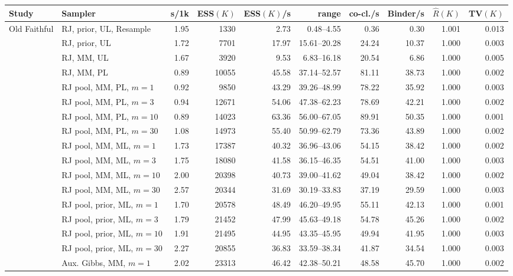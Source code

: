 \begin{tabular}{ll rrrrrrrr}
\toprule
Study & Sampler & s/1k & ESS$(K)$ & ESS$(K)$/s & range & co-cl./s & Binder/s & $\hat R(K)$ & TV$(K)$ \\
\midrule
Old Faithful & RJ, prior, UL, Resample & 1.95 & 1330 & 2.73 & 0.48--4.55 & 0.36 & 0.30 & 1.001 & 0.013 \\
 & RJ, prior, UL & 1.72 & 7701 & 17.97 & 15.61--20.28 & 24.24 & 10.37 & 1.000 & 0.003 \\
 & RJ, MM, UL & 1.67 & 3920 & 9.53 & 6.83--16.18 & 20.54 & 6.86 & 1.000 & 0.005 \\
 & RJ, MM, PL & 0.89 & 10055 & 45.58 & 37.14--52.57 & 81.11 & 38.73 & 1.000 & 0.002 \\
 & RJ pool, MM, PL, $m{=}1$ & 0.92 & 9850 & 43.29 & 39.26--48.99 & 78.22 & 35.92 & 1.000 & 0.003 \\
 & RJ pool, MM, PL, $m{=}3$ & 0.94 & 12671 & 54.06 & 47.38--62.23 & 78.69 & 42.21 & 1.000 & 0.002 \\
 & RJ pool, MM, PL, $m{=}10$ & 0.89 & 14023 & 63.36 & 56.00--67.05 & 89.91 & 50.35 & 1.000 & 0.001 \\
 & RJ pool, MM, PL, $m{=}30$ & 1.08 & 14973 & 55.40 & 50.99--62.79 & 73.36 & 43.89 & 1.000 & 0.002 \\
 & RJ pool, MM, ML, $m{=}1$ & 1.73 & 17387 & 40.32 & 36.96--43.06 & 54.15 & 38.42 & 1.000 & 0.002 \\
 & RJ pool, MM, ML, $m{=}3$ & 1.75 & 18080 & 41.58 & 36.15--46.35 & 54.51 & 41.00 & 1.000 & 0.003 \\
 & RJ pool, MM, ML, $m{=}10$ & 2.00 & 20398 & 40.73 & 39.00--41.62 & 49.04 & 38.42 & 1.000 & 0.002 \\
 & RJ pool, MM, ML, $m{=}30$ & 2.57 & 20344 & 31.69 & 30.19--33.83 & 37.19 & 29.59 & 1.000 & 0.003 \\
 & RJ pool, prior, ML, $m{=}1$ & 1.70 & 20578 & 48.49 & 46.20--49.95 & 55.11 & 42.13 & 1.000 & 0.001 \\
 & RJ pool, prior, ML, $m{=}3$ & 1.79 & 21452 & 47.99 & 45.63--49.18 & 54.78 & 45.26 & 1.000 & 0.002 \\
 & RJ pool, prior, ML, $m{=}10$ & 1.91 & 21495 & 44.95 & 43.35--45.95 & 49.94 & 41.95 & 1.000 & 0.003 \\
 & RJ pool, prior, ML, $m{=}30$ & 2.27 & 20855 & 36.83 & 33.59--38.34 & 41.87 & 34.54 & 1.000 & 0.003 \\
 & Aux. Gibbs, MM, $m{=}1$ & 2.02 & 23313 & 46.42 & 42.38--50.21 & 48.58 & 45.70 & 1.000 & 0.002 \\

\end{tabular}
